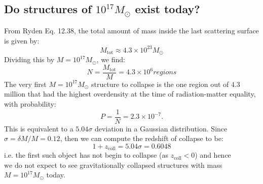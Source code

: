 \subsection{Do structures of $10^{17}M_\odot$ exist today?}
From Ryden Eq. 12.38, the total amount of mass inside the last scattering surface is given by:
\begin{equation}
    M_{\text{tot}} \approx 4.3 \times 10^{23}M_\odot
\end{equation}
Dividing this by $M = 10^{17}M_\odot$, we find:
\begin{equation}
    N = \frac{M_{\text{tot}}}{M} = 4.3 \times 10^6 \si{regions}
\end{equation}
The very first $M = 10^{17}M_\odot$ structure to collapse is the one region out of 4.3 million that had the highest overdensity at the time of radiation-matter equality, with probability:
\begin{equation}
    P = \frac{1}{N} = 2.3 \times 10^{-7}.
\end{equation}
This is equivalent to a $5.04\sigma$ deviation in a Gaussian distribution. Since $\sigma = \delta M/M = 0.12$, then we can compute the redshift of collapse to be:
\begin{equation}
    1 + z_{\text{coll}} = 5.04\sigma = 0.6048
\end{equation}
i.e. the first such object has not begin to collapse (as $z_{\text{coll}} < 0$) and hence $\boxed{\text{we do not}}$ expect to see gravitationally collapsed structures with mass $M = 10^{17}M_\odot$ today.


\subsection{}